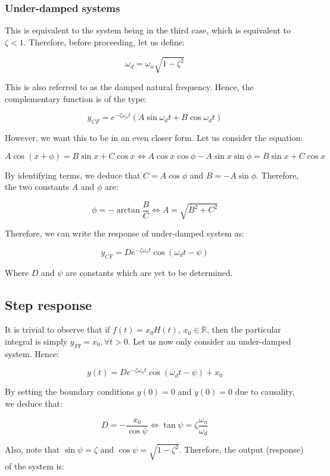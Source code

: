 \documentclass[12pt]{article}
\begin{document}
\subsubsection{Under-damped systems}

This is equivalent to the system being in the third case, which is equivalent to $\zeta < 1$. Therefore, before proceeding, let us define:

\[ \omega_d = \omega_n\sqrt{1 - \zeta^2} \]

This is also referred to as the damped natural frequency. Hence, the complementary function is of the type:

\[ y_{CF} = e^{-\zeta\omega_n t}\left(A\sin{\omega_d t} + B\cos{\omega_d t}\right) \]

However, we want this to be in an even closer form. Let us consider the equation:

\[ A\cos{(x + \phi)} = B\sin{x} + C\cos{x} \iff A\cos{x}\cos{\phi} - A\sin{x}\sin{\phi} = B\sin{x} + C\cos{x} \]

By identifying terms, we deduce that $C = A\cos{\phi}$ and $B = -A\sin{\phi}$. Therefore, the two constants $A$ and $\phi$ are:

\[ \phi = -\arctan{\frac{B}{C}} \iff A = \sqrt{B^2 + C^2} \]

Therefore, we can write the response of under-damped system as:

\[ y_{CF} = De^{-\zeta\omega_n t}\cos{(\omega_d t - \psi)} \]

Where $D$ and $\psi$ are constants which are yet to be determined.

\subsection{Step response}

It is trivial to observe that if $f(t) = x_0H(t)$, $x_0 \in \mathbb{R}$, then the particular integral is simply $y_{PI} = x_0, \forall t > 0$. Let us now only consider an under-damped system. Hence:

\[ y(t) = De^{-\zeta\omega_n t}\cos{(\omega_d t - \psi)} + x_0 \]

By setting the boundary conditions $y(0) = 0$ and $\dot{y}(0) = 0$ due to causality, we deduce that:

\[ D = -\frac{x_0}{\cos{\psi}} \iff \tan{\psi} = \zeta\frac{\omega_n}{\omega_d} \]

Also, note that $\sin{\psi} = \zeta$ and $\cos{\psi} = \sqrt{1 - \zeta^2}$. Therefore, the output (response) of the system is:
\end{document}
